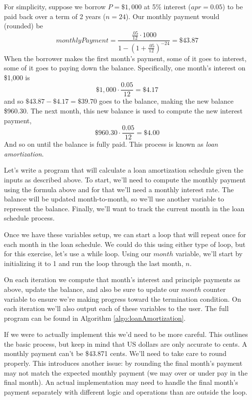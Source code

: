 For simplicity, suppose we borrow $P = \$1,000$ at 5\% interest ($apr = 0.05$) to 
be paid back over a term of 2 years ($n = 24$).  Our monthly payment would 
(rounded) be 
  $$ {monthlyPayment} = \frac{\frac{.05}{12}\cdot 1000}{1 - (1 + \frac{.05}{12})^{-24}} = \$43.87$$
When the borrower makes the first month's payment, some of it goes to interest, 
some of it goes to paying down the balance.  Specifically, one month's interest on \$1,000 is
  $$\$1,000 \cdot \frac{0.05}{12} = \$4.17$$
and so $\$43.87 - \$4.17 = \$39.70$ goes to the balance, making the new balance
\$960.30.  The next month, this new balance is used to compute the new interest payment, 
  $$\$960.30 \cdot \frac{0.05}{12} = \$4.00$$
And so on until the balance is fully paid.  This process is known as \emph{loan amortization}.

Let's write a program that will calculate a loan amortization schedule given the 
inputs as described above.  To start, we'll need to compute the monthly payment
using the formula above and for that we'll need a monthly interest rate.  The
balance will be updated month-to-month, so we'll use another variable to represent the balance.  Finally, we'll want to track the current month in the loan 
schedule process.  

Once we have these variables setup, we can start a loop that will repeat once for
each month in the loan schedule.  We could do this using either type of loop, but
for this exercise, let's use a while loop.  Using our $month$ variable, we'll start by
initializing it to 1 and run the loop through the last month, $n$.  

On each iteration we compute that month's interest and principle payments as above, 
update the balance, and also be sure to update our $month$ counter variable to
ensure we're making progress toward the termination condition.  On each 
iteration we'll also output each of these variables to the user.  The full 
program can be found in Algorithm \ref{algo:loanAmortization}.

If we were to actually implement this we'd need to be more careful.  This outlines
the basic process, but keep in mind that US dollars are only accurate to cents.
A monthly payment can't be \$43.871 cents.  We'll need to take care to round
properly.  This introduces another issue: by rounding the final month's payment
may not match the expected monthly payment (we may over or under pay in the 
final month).  An actual implementation may need to handle the final month's 
payment separately with different logic and operations than are outside 
the loop.

